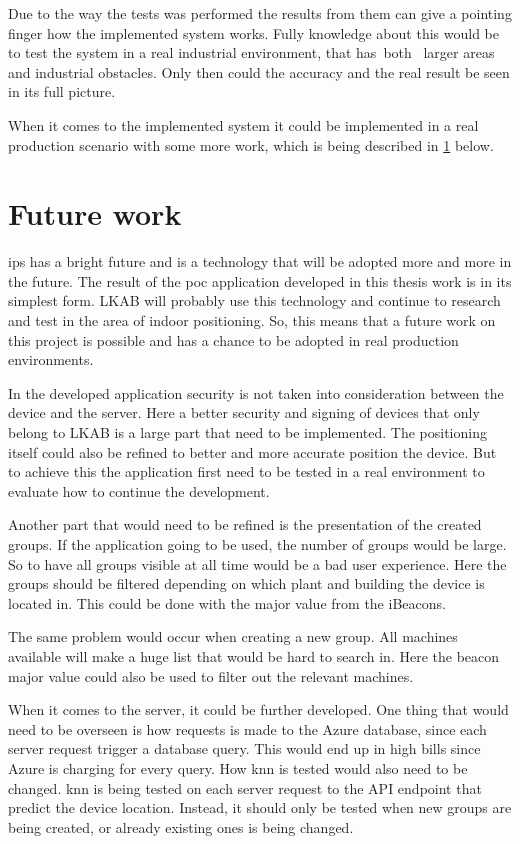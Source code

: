 Due to the way the tests was performed the results from them can give a pointing finger how the implemented system works.
Fully knowledge about this would be to test the system in a real industrial environment, that has both  larger areas and industrial obstacles.
Only then could the accuracy and the real result be seen in its full picture.

\bigskip

When it comes to the implemented system it could be implemented in a real production scenario with some more work, which is being described in \cref{sec:conclusionFutureWork} below.


\section{Future work}\label{sec:conclusionFutureWork}
\Acrlong{ips} has a bright future and is a technology that will be adopted more and more in the future.
The result of the \acrlong{poc} application developed in this thesis work is in its simplest form.
LKAB will probably use this technology and continue to research and test in the area of indoor positioning.
So, this means that a future work on this project is possible and has a chance to be adopted in real production environments.

\bigskip

In the developed application security is not taken into consideration between the device and the server.
Here a better security and signing of devices that only belong to LKAB is a large part that need to be implemented.
The positioning itself could also be refined to better and more accurate position the device. 
But to achieve this the application first need to be tested in a real environment to evaluate how to continue the development.

\bigskip

Another part that would need to be refined is the presentation of the created groups.
If the application going to be used, the number of groups would be large.
So to have all groups visible at all time would be a bad user experience.
Here the groups should be filtered depending on which plant and building the device is located in.
This could be done with the major value from the iBeacons.

\bigskip

The same problem would occur when creating a new group.
All machines available will make a huge list that would be hard to search in.
Here the beacon major value could also be used to filter out the relevant machines.

\bigskip

When it comes to the server, it could be further developed.
One thing that would need to be overseen is how requests is made to the Azure database, since each server request trigger a database query.
This would end up in high bills since Azure is charging for every query.
How \acrfull{knn} is tested would also need to be changed.
\acrshort{knn} is being tested on each server request to the API endpoint that predict the device location.
Instead, it should only be tested when new groups are being created, or already existing ones is being changed.

